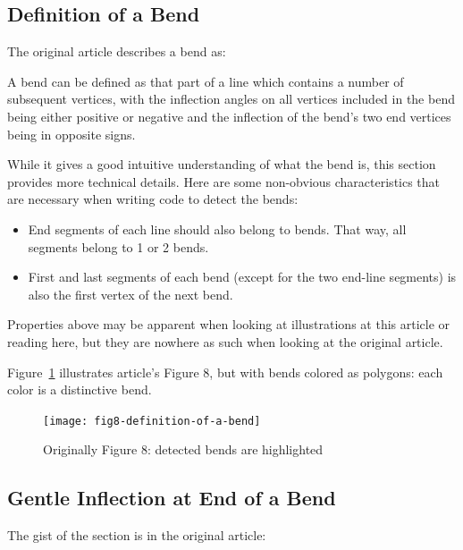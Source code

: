 \documentclass[a4paper]{article}
\begin{document}
\subsection{Definition of a Bend}
\label{sec:definition-of-a-bend}

The original article describes a bend as:

\begin{displayquote}
    A bend can be defined as that part of a line which contains a number of
    subsequent vertices, with the inflection angles on all vertices included in
    the bend being either positive or negative and the inflection of the bend's
    two end vertices being in opposite signs.
\end{displayquote}

While it gives a good intuitive understanding of what the bend is, this section
provides more technical details. Here are some non-obvious characteristics that
are necessary when writing code to detect the bends:

\begin{itemize}
    \item End segments of each line should also belong to bends. That way, all
        segments belong to 1 or 2 bends.

    \item First and last segments of each bend (except for the two end-line
        segments) is also the first vertex of the next bend.
\end{itemize}

Properties above may be apparent when looking at illustrations at this article
or reading here, but they are nowhere as such when looking at the original
article.

Figure~\ref{fig:fig8-definition-of-a-bend} illustrates article's Figure 8,
but with bends colored as polygons: each color is a distinctive bend.

\begin{figure}[h]
    \centering
    \texttt{[image: fig8-definition-of-a-bend]}
    \caption{Originally Figure 8: detected bends are highlighted}
    \label{fig:fig8-definition-of-a-bend}
\end{figure}

\subsection{Gentle Inflection at End of a Bend}

The gist of the section is in the original article:
\end{document}
